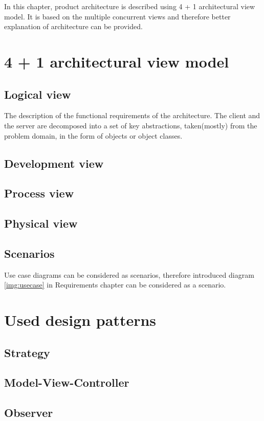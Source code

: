 In this chapter, product architecture is described using 4 + 1 architectural view model.
It is based on the multiple concurrent views and therefore better explanation of architecture can be provided.

\section{4 + 1 architectural view model}
\subsection{Logical view}
The description of the functional requirements of the architecture. The client and the server are decomposed into a set of key abstractions, taken(mostly) from the problem domain, in the form of objects or object classes.
\subsection{Development view}
\subsection{Process view}
\subsection{Physical view}
\subsection{Scenarios}
Use case diagrams can be considered as scenarios, therefore introduced diagram \ref{img:usecase} in Requirements chapter can be considered as a scenario.

\section{Used design patterns}
\subsection{Strategy}
\subsection{Model-View-Controller}
\subsection{Observer}